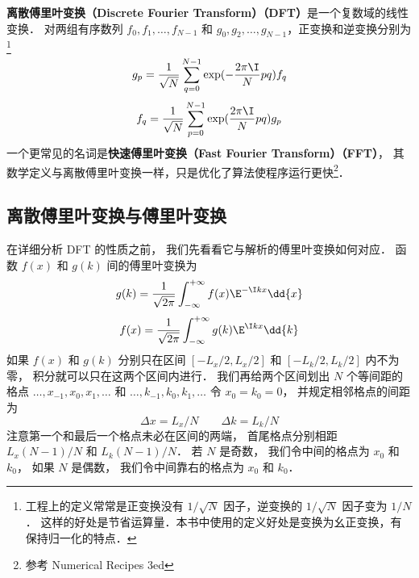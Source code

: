 
\textbf{离散傅里叶变换（Discrete Fourier Transform）（DFT）}是一个复数域的线性变换． 对两组有序数列 $f_0, f_1, \dots, f_{N-1}$ 和 $g_0,g_2,\dots, g_{N-1}$，正变换和逆变换分别为\footnote{工程上的定义常常是正变换没有 $1/\sqrt{N}$ 因子，逆变换的 $1/\sqrt{N}$ 因子变为 $1/N$． 这样的好处是节省运算量．本书中使用的定义好处是变换为幺正变换，有保持归一化的特点．}
\begin{equation}\label{DFT_eq1}
g_p = \frac{1}{\sqrt{N}}\sum_{q=0}^{N-1} \exp(-\frac{2\pi\I}{N} p q ) f_q
\end{equation}
\begin{equation}\label{DFT_eq2}
f_q = \frac{1}{\sqrt{N}}\sum_{p=0}^{N-1} \exp(\frac{2\pi\I}{N} p q) g_p
\end{equation}
一个更常见的名词是\textbf{快速傅里叶变换（Fast Fourier Transform）（FFT）}， 其数学定义与离散傅里叶变换一样，只是优化了算法使程序运行更快\footnote{参考 Numerical Recipes 3ed}．

\subsection{离散傅里叶变换与傅里叶变换}
在详细分析 DFT 的性质之前， 我们先看看它与解析的傅里叶变换如何对应． 函数 $f(x)$ 和 $g(k)$ 间的傅里叶变换为
\begin{equation}\label{DFT_eq3}
g(k) = \frac{1}{\sqrt{2\pi}} \int_{-\infty}^{+\infty} f(x)\E^{-\I kx} \dd{x}
\end{equation}
\begin{equation}\label{DFT_eq4}
f(x) = \frac{1}{\sqrt{2\pi}} \int_{-\infty}^{+\infty} g(k)\E^{\I kx} \dd{k}
\end{equation}
如果 $f(x)$ 和 $g(k)$ 分别只在区间 $[-L_x/2, L_x/2]$ 和 $[-L_k/2, L_k/2]$ 内不为零， 积分就可以只在这两个区间内进行． 我们再给两个区间划出 $N$ 个等间距的格点 $\dots, x_{-1}, x_0, x_1,\dots$ 和 $\dots, k_{-1}, k_0, k_1,\dots$ 令 $x_0 = k_0 = 0$， 并规定相邻格点的间距为
\begin{equation}\label{DFT_eq5}
\Delta x = L_x/N \qquad \Delta k = L_k/N
\end{equation}
注意第一个和最后一个格点未必在区间的两端， 首尾格点分别相距 $L_x(N-1)/N$ 和 $L_k(N-1)/N$． 若 $N$ 是奇数， 我们令中间的格点为 $x_0$ 和 $k_0$， 如果 $N$ 是偶数， 我们令中间靠右的格点为 $x_0$ 和 $k_0$．

